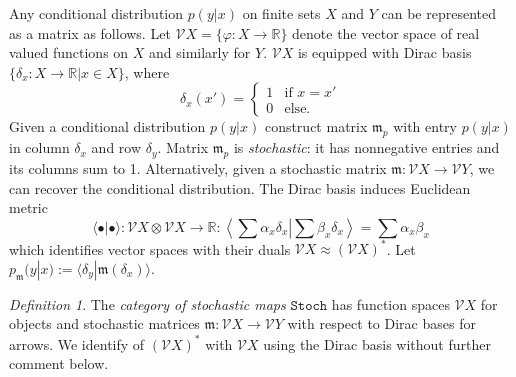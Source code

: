 \documentclass[12pt]{article}
\newcommand{\vecify}{{\mathcal V}}
\newcommand{\scat}{{\mathtt{Stoch}}}
\newcommand{\bra}{{\langle}}
\newcommand{\ket}{{\rangle}}
\newcommand{\bR}{{\mathbb R}}
\newcommand{\fm}{{\mathfrak m}}
\theoremstyle{remark}
\newtheorem{defn}{Definition}
\begin{document}
Any conditional distribution $p(y|x)$ on finite sets $X$ and $Y$ can be 
represented as a matrix as follows. Let $\vecify X=\{\varphi:X\rightarrow 
\bR\}$ denote the vector space of real valued functions on $X$ and similarly
for $Y$. $\vecify X$ is equipped with Dirac basis 
$\{\delta_x:X\rightarrow\bR|x\in X\}$, where
\begin{equation*}
    \delta_x(x') = \left\{\begin{matrix}
		1 & \mbox{if }x=x'\\
		0 & \mbox{else}.
	\end{matrix}\right.
\end{equation*}
Given a conditional distribution $p(y|x)$ construct matrix $\fm_p$ with 
entry $p(y|x)$ in column $\delta_x$ and row $\delta_y$. Matrix $\fm_p$ is 
\emph{stochastic}: it has nonnegative entries and its columns sum to 1. 
Alternatively, given a stochastic matrix $\fm:\vecify X\rightarrow \vecify 
Y$, we can recover the conditional distribution. The Dirac basis induces 
Euclidean metric
\begin{equation}
	\bra\bullet|\bullet\ket:\vecify X\otimes\vecify X\rightarrow\bR:
	\left\langle\sum\alpha_x\delta_x\left|\sum\beta_x\delta_x\right\rangle\right.=\sum\alpha_x\beta_x
	\label{e:metric}
\end{equation}
which identifies vector spaces with their duals $\vecify X\approx 
(\vecify X)^*$. Let $p_\fm(y|x) := \bra\delta_y|\fm(\delta_x)\ket$.

\begin{defn}
	\label{d:catstoch}
	The \emph{category of stochastic maps} $\scat$ has function spaces 
    $\vecify X$ for objects and stochastic matrices $\fm:\vecify 
    X\rightarrow \vecify Y$ with respect to Dirac bases for arrows. We 
    identify of $(\vecify X)^*$ with $\vecify X$ using the Dirac basis 
    without further comment below.
\end{defn}
	
\end{document}
